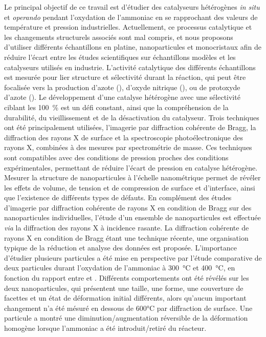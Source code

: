 \begin{mdframed}[linecolor=Prune,linewidth=1]
\begin{multicols}{2}
Le principal objectif de ce travail est d'étudier des catalyseurs hétérogènes \textit{in situ} et \textit{operando} pendant l'oxydation de l'ammoniac en se rapprochant des valeurs de température et pression industrielles.
Actuellement, ce processus catalytique et les changements structurels associés sont mal compris, et nous proposons d'utiliser différents échantillons en platine, nanoparticules et monocristaux afin de réduire l'écart entre les études scientifiques sur échantillons modèles et les catalyseurs utilisés en industrie.
L'activité catalytique des différents échantillons est mesurée pour lier structure et sélectivité durant la réaction, qui peut être focalisée vers la production d'azote (), d'oxyde nitrique (), ou de protoxyde d'azote ().
Le développement d'une catalyse hétérogène avec une sélectivité ciblant les \qty{100}{\percent} est un défi constant, ainsi que la compréhension de la durabilité, du vieillissement et de la désactivation du catalyseur.
Trois techniques ont été principalement utilisées, l'imagerie par diffraction cohérente de Bragg, la diffraction des rayons X de surface et la spectroscopie photoélectronique des rayons X, combinées à des mesures par spectrométrie de masse.
Ces techniques sont compatibles avec des conditions de pression proches des conditions expérimentales, permettant de réduire l'écart de pression en catalyse hétérogène.
Mesurer la structure de nanoparticules à l'échelle nanométrique permet de révéler les effets de volume, de tension et de compression de surface et d'interface, ainsi que l'existence de différents types de défauts.
En complément des études d'imagerie par diffraction cohérente de rayons X en condition de Bragg sur des nanoparticules individuelles, l'étude d'un ensemble de nanoparticules est effectuée \textit{via} la diffraction des rayons X à incidence rasante.
La diffraction cohérente de rayons X en condition de Bragg étant une technique récente, une organisation typique de la réduction et analyse des données est proposée.
L'importance d'étudier plusieurs particules a été mise en perspective par l'étude comparative de deux particules durant l'oxydation de l'ammoniac à \qty{300}{\degreeCelsius} et \qty{400}{\degreeCelsius}, en fonction du rapport entre  et .
Différents comportements ont été révélés sur les deux nanoparticules, qui présentent une taille, une forme, une couverture de facettes et un état de déformation initial différents, alors qu'aucun important changement n'a été mésuré en dessous de 600°C par diffraction de surface.
Une particule a montré une diminution/augmentation réversible de la déformation homogène lorsque l'ammoniac a été introduit/retiré du réacteur.

\end{multicols}
\end{mdframed}
